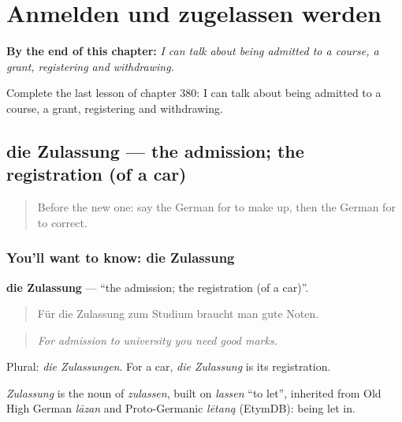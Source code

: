 
\chapter{Anmelden und zugelassen werden}
\label{ch:ge-anmelden-und-zugelassen-werden}

\begin{chapteropening}
\textbf{By the end of this chapter:} \emph{I can talk about being admitted to a course, a grant, registering and withdrawing.}

Complete the last lesson of chapter 380: I can talk about being admitted to a course, a grant, registering and withdrawing.
\end{chapteropening}

\section[die Zulassung]{die Zulassung — the admission; the registration (of a car)}

\label{lesson:GE-C380-zulassung}



\begin{quote}
Before the new one: say the German for to make up, then the German for to correct.
\end{quote}

\subsection*{You'll want to know: die Zulassung}
\textbf{die Zulassung} — \textquotedblleft{}the admission; the registration (of a car)\textquotedblright{}.

\begin{quote}
Für die Zulassung zum Studium braucht man gute Noten.
\end{quote}

\begin{quote}
\emph{For admission to university you need good marks.}
\end{quote}

Plural: \emph{die Zulassungen}. For a car, \emph{die Zulassung} is its registration.

\begin{cousinweb}
\emph{Zulassung} is the noun of \emph{zulassen}, built on \emph{lassen} \textquotedblleft{}to let\textquotedblright{}, inherited from Old High German \emph{lāzan} and Proto-Germanic \emph{lētaną} (EtymDB): being let in.
\end{cousinweb}

